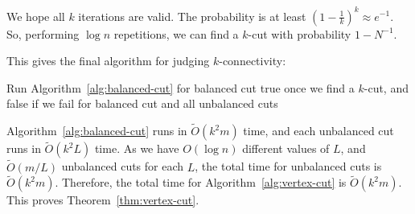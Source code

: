 We hope all $k$ iterations are valid. The probability is at least $(1 - \frac{1}{k})^k \approx e^{-1}$. So, performing $\log n$ repetitions, we can find a $k$-cut with probability $1 - N^{-1}$.

This gives the final algorithm for judging $k$-connectivity:

\begin{algorithm}[H]
	\caption{Vertex Cut}\label{alg:vertex-cut}
	Run Algorithm~\ref{alg:balanced-cut} for balanced cut\;
	\Return true once we find a $k$-cut, and false if we fail for balanced cut and all unbalanced cuts\;
\end{algorithm}

Algorithm~\ref{alg:balanced-cut} runs in $\tilde{O}(k^2 m)$ time, and each unbalanced cut runs in $\tilde{O}(k^2 L)$ time. As we have $O(\log n)$ different values of $L$, and $\tilde{O}(m/L)$ unbalanced cuts for each $L$, the total time for unbalanced cuts is $\tilde{O}(k^2 m)$. Therefore, the total time for Algorithm~\ref{alg:vertex-cut} is $\tilde{O}(k^2 m)$.
This proves Theorem~\ref{thm:vertex-cut}.
